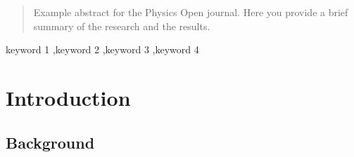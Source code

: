 \documentclass[final,5p,times,twocolumn,authoryear]{elsarticle}
\begin{document}
\begin{frontmatter}
\begin{abstract}
Example abstract for the Physics Open journal. Here you provide a brief summary of the research and the results.
\end{abstract}



\begin{keyword}
keyword 1 \sep keyword 2 \sep keyword 3 \sep keyword 4



\end{keyword}


\end{frontmatter}




\section{Introduction}
\subsection{Background}
\end{document}

